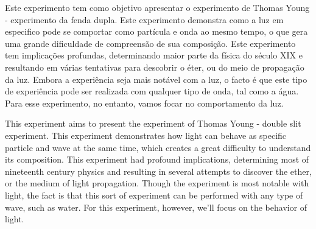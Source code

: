 %
%
%
Este experimento tem como objetivo apresentar o experimento de Thomas Young - experimento da fenda dupla. Este experimento demonstra como a luz em especifico pode se comportar como partícula e onda ao mesmo tempo, o que gera uma grande dificuldade de compreensão de sua composição. Este experimento tem implicações profundas, determinando maior parte da física do século XIX e resultando em várias tentativas para descobrir o éter, ou do meio de propagação da luz. Embora a experiência seja mais notável com a luz, o facto é que este tipo de experiência pode ser realizada com qualquer tipo de onda, tal como a água. Para esse experimento, no entanto, vamos focar no comportamento da luz.

%

This experiment aims to present the experiment of Thomas Young - double slit experiment. This experiment demonstrates how light can behave as specific particle and wave at the same time, which creates a great difficulty to understand its composition. This experiment had profound implications, determining most of nineteenth century physics and resulting in several attempts to discover the ether, or the medium of light propagation. Though the experiment is most notable with light, the fact is that this sort of experiment can be performed with any type of wave, such as water. For this experiment, however, we'll focus on the behavior of light.

